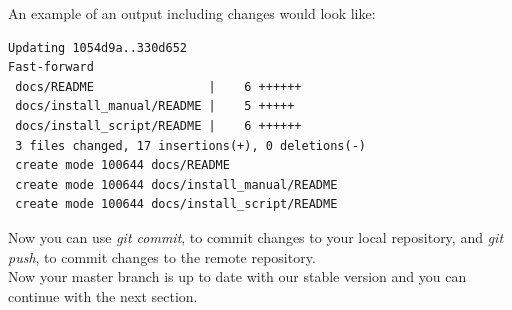 An example of an output including changes would look like:
\begin{lstlisting}
Updating 1054d9a..330d652
Fast-forward
 docs/README                |    6 ++++++
 docs/install_manual/README |    5 +++++
 docs/install_script/README |    6 ++++++
 3 files changed, 17 insertions(+), 0 deletions(-)
 create mode 100644 docs/README
 create mode 100644 docs/install_manual/README
 create mode 100644 docs/install_script/README 
\end{lstlisting}
Now you can use \emph{git commit}, to commit changes to your local repository, and \emph{git push}, to commit changes to the remote repository. \\
Now your master branch is up to date with our stable version and you can continue with the next section.

